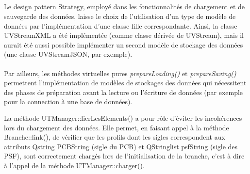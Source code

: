 \documentclass[a4paper,10pt,french]{report}
\begin{document}
			\paragraph{}
		\subsubsection{}
			\paragraph{}
			\paragraph{}
			\paragraph{}	
	\subsection{}\label{subsec:IIB}
	
	Le design pattern Strategy, employé dans les fonctionnalités de chargement et de sauvegarde des données, laisse le choix de l'utilisation d'un type de modèle de données par l'implémentation d'une classe fille correspondante.
	Ainsi, la classe UVStreamXML a été implémentée (comme classe dérivée de UVStream), mais il aurait été aussi possible implémenter un second modèle de stockage des données (une classe UVStreamJSON, par exemple).\\\\
	Par ailleurs, les méthodes virtuelles pures \emph{prepareLoading()} et \emph{prepareSaving()} permettent l'implémentation de modèles de stockages des données qui nécessitent des phases de préparation avant la lecture ou l'écriture de données (par exemple pour la connection à une base de données).
	
	La méthode UTManager::lierLesElements() a pour rôle d'éviter les incohérences lors du chargement des données.
	Elle permet, en faisant appel à la méthode Branche::link(), de vérifier que les profils dont les sigles correspondent aux attributs Qstring PCBString (sigle du PCB) et QStringlist psfString (sigle des PSF), sont correctement chargés lors de l'initialisation de la branche, c'est à dire à l'appel de la méthode UTManager::charger().\\\\
	
\end{document}
